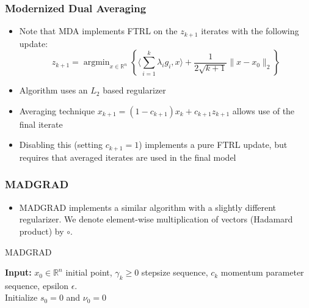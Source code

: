 \documentclass{beamer}
\newcommand{\R}{\mathbb{R}}
\newcommand{\argmin}{\mathop{\text{argmin}}}
\begin{document}
\begin{frame}
  \frametitle{Modernized Dual Averaging}

  \begin{itemize}
    \item Note that MDA implements FTRL on the $z_{k+1}$ iterates with the following update:
    \[
      z_{k+1} = \argmin_{x \in \R^n}\left\{\langle \sum\limits_{i=1}^{k}\lambda_i g_i, x \rangle +
      \frac{1}{2\sqrt{k+1}}\|x - x_0\|_2\right\}
    \]
    \item Algorithm uses an $L_2$ based regularizer
    \item Averaging technique $x_{k+1} = (1 - c_{k+1})x_k + c_{k+1}z_{k+1}$ allows use of the final iterate
    \item Disabling this (setting $c_{k+1} = 1$) implements a pure FTRL update, but requires that averaged iterates are
      used in the final model
  \end{itemize}

\end{frame}

\begin{frame}
  \frametitle{MADGRAD}

  \begin{itemize}
    \item MADGRAD implements a similar algorithm with a slightly different regularizer. We denote element-wise
      multiplication of vectors (Hadamard product) by $\circ$.
  \end{itemize}

  \begin{algorithm}[H]
    \caption{MADGRAD}\label{algo:madgrad}
    \scriptsize
    \textbf{Input:} $x_0 \in \R^n$ initial point, $\gamma_k \geq 0$ stepsize sequence, $c_k$ momentum parameter
    sequence, epsilon $\epsilon$. \\
    Initialize $s_0= 0$ and $\nu_0 = 0$ \\
  \end{algorithm}
\end{frame}
\end{document}
